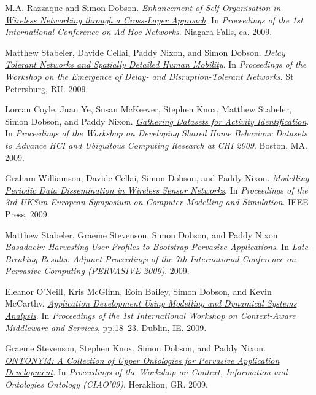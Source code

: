 \documentclass[11pt]{article}
\begin{document}
\label{org92f5cfa}M.A. Razzaque and Simon Dobson.  \emph{\href{https://simondobson.org/softcopy/adhoc-09.pdf}{Enhancement of Self-Organisation in Wireless Networking through a Cross-Layer Approach}}. In \emph{Proceedings of the 1st International Conference on Ad Hoc Networks}. Niagara Falls, ca. 2009.

\label{org98b7b9e}Matthew Stabeler, Davide Cellai, Paddy Nixon, and Simon Dobson.  \emph{\href{https://simondobson.org/softcopy/edtn-09.pdf}{Delay Tolerant Networks and Spatially Detailed Human Mobility}}. In \emph{Proceedings of the Workshop on the Emergence of Delay- and Disruption-Tolerant Networks}. St Petersburg, RU. 2009.

\label{orgd58cb1a}Lorcan Coyle, Juan Ye, Susan McKeever, Stephen Knox, Matthew Stabeler, Simon Dobson, and Paddy Nixon.  \emph{\href{https://simondobson.org/softcopy/2008datasets-08.pdf}{Gathering Datasets for Activity Identification}}. In \emph{Proceedings of the Workshop on Developing Shared Home Behaviour Datasets to Advance HCI and Ubiquitous Computing Research at CHI 2009}. Boston, MA. 2009.

\label{org47a5f20}Graham Williamson, Davide Cellai, Simon Dobson, and Paddy Nixon.  \emph{\href{https://simondobson.org/softcopy/uksim-09.pdf}{Modelling Periodic Data Dissemination in Wireless Sensor Networks}}. In \emph{Proceedings of the 3rd UKSim European Symposium on Computer Modelling and Simulation}. IEEE Press. 2009.

\label{org219be95}Matthew Stabeler, Graeme Stevenson, Simon Dobson, and Paddy Nixon.  \emph{Basadaeir: Harvesting User Profiles to Bootstrap Pervasive Applications}. In \emph{Late-Breaking Results: Adjunct Proceedings of the 7th International Conference on Pervasive Computing (PERVASIVE 2009)}. 2009.

\label{org731e47f}Eleanor O’Neill, Kris McGlinn, Eoin Bailey, Simon Dobson, and Kevin McCarthy.  \emph{\href{https://simondobson.org/softcopy/iwcams-09.pdf}{Application Development Using Modelling and Dynamical Systems Analysis}}. In \emph{Proceedings of the 1st International Workshop on Context-Aware Middleware and Services}, pp.18–23. Dublin, IE. 2009.

\label{orgaf6090c}Graeme Stevenson, Stephen Knox, Simon Dobson, and Paddy Nixon.  \emph{\href{https://simondobson.org/softcopy/ontonym-ciao2009.pdf}{ONTONYM: A Collection of Upper Ontologies for Pervasive Application Development}}. In \emph{Proceedings of the Workshop on Context, Information and Ontologies Ontology (CIAO’09)}. Heraklion, GR. 2009.
\end{document}
